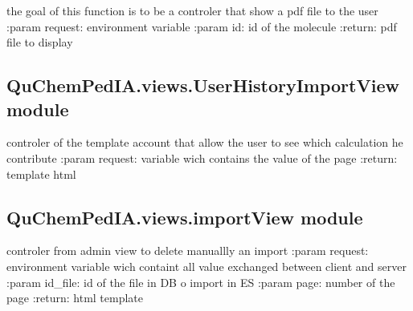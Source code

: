 \documentclass[letterpaper,10pt,english]{sphinxmanual}
\begin{document}
\begin{fulllineitems}
\label{\detokenize{QuChemPedIA.views:QuChemPedIA.views.RapportView.rapport}}
the goal of this function is to be a controler that show a pdf file to the user
:param request: environment variable
:param id: id of the molecule
:return: pdf file to display

\end{fulllineitems}



\subsection{QuChemPedIA.views.UserHistoryImportView module}
\label{\detokenize{QuChemPedIA.views:module-QuChemPedIA.views.UserHistoryImportView}}\label{\detokenize{QuChemPedIA.views:quchempedia-views-userhistoryimportview-module}}

\begin{fulllineitems}
\label{\detokenize{QuChemPedIA.views:QuChemPedIA.views.UserHistoryImportView.user_history_import}}
controler of the template account that allow the user to see which calculation he contribute
:param request: variable wich contains the value of the page
:return: template html

\end{fulllineitems}



\subsection{QuChemPedIA.views.importView module}
\label{\detokenize{QuChemPedIA.views:module-QuChemPedIA.views.importView}}\label{\detokenize{QuChemPedIA.views:quchempedia-views-importview-module}}

\begin{fulllineitems}
\label{\detokenize{QuChemPedIA.views:QuChemPedIA.views.importView.delete_import}}
controler from admin view to delete manuallly an import
:param request: environment variable wich containt all value exchanged between client and server
:param id\_file: id of the file in DB o import in ES
:param page: number of the page
:return: html template

\end{fulllineitems}
\end{document}

